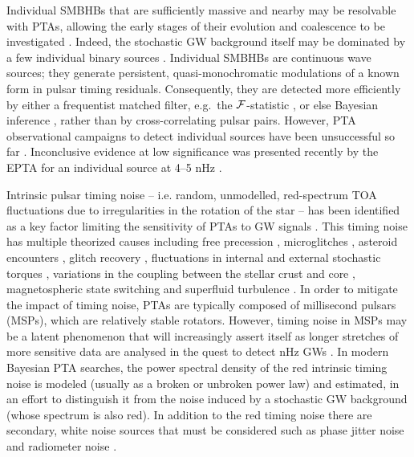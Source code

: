 \documentclass[fleqn,usenatbib,useAMS]{mnras}
\begin{document}
Individual SMBHBs that are sufficiently massive and nearby may be resolvable with PTAs, allowing the early stages of their evolution and coalescence to be investigated \citep{Sesana2010,Yardley2010,Zhu10,Babak2012,2013CQGra..30v4004E,Zhupulsarterms}. 
Indeed, the stochastic GW background itself may be dominated by a few individual binary sources \citep{Ravi2012singlesource}. Individual SMBHBs are continuous wave sources; they generate persistent, quasi-monochromatic modulations of a known form in pulsar timing residuals. Consequently, they are detected more efficiently by either a frequentist matched filter, e.g.\ the ${\cal F}$-statistic \citep{Lee2011MNRAS.414.3251L, Ellis2012ApJ,Zhu2014PPTA}, or else Bayesian inference \citep{Ellis2016,Arzoumanian2020A}, rather than by cross-correlating pulsar pairs. However, PTA observational campaigns to detect individual sources have been unsuccessful so far \citep{Jenet2004,Zhu2014PPTA,Babak2016,Arzoumanian2023}. Inconclusive evidence at low significance was presented recently by the EPTA for an individual source at 4--5 nHz \citep{2023arXiv230616226A}. \newline 


Intrinsic pulsar timing noise -- i.e.  random, unmodelled, red-spectrum TOA fluctuations due to irregularities in the rotation of the star -- has been identified as a key factor limiting the sensitivity of PTAs to GW signals \citep{Shannon2010,Lasky2015,Caballero2016,Goncharov2021}. This timing noise has multiple theorized causes including free precession \citep{free_precession_kerr,stairs_freeprecession}, microglitches \citep{Alessandro1995,Melatos2008,Espinoza2021}, asteroid encounters \citep{Shannon_2013,Brook_2014}, glitch recovery \citep{Johnston10,Hobbs2010glitch}, fluctuations in internal and external stochastic torques \citep{Cordes1981, 2006MNRAS.370L..76U,Myers2021MNRAS.502.3113M,Meyers2021,Antonelli2023}, variations in the coupling between the stellar crust and core \citep{Jones1990MNRAS.246..364J,Meyers2021,Melatos2023}, magnetospheric state switching \citep{magneto1,Lyne2010L,Stairs2019MNRAS.485.3230S} and superfluid turbulence \citep{Greenstein1970,Peralta2006,Melatos2014}. In order to mitigate the impact of timing noise, PTAs are typically composed of millisecond pulsars (MSPs), which are relatively stable rotators. However, timing noise in MSPs may be a latent phenomenon that will increasingly assert itself as longer stretches of more sensitive data are analysed in the quest to detect nHz GWs \citep{Shannon2010}. In modern Bayesian PTA searches, the power spectral density of the red intrinsic timing noise is modeled (usually as a broken or unbroken power law) and estimated, in an effort to distinguish it from the noise induced by a stochastic GW background (whose spectrum is also red). In addition to the red timing noise there are secondary, white noise sources that must be considered such as phase jitter noise and radiometer noise \citep{Cordes2010,Lam2019,Parthasarathy2021}. \newline 
\end{document}
